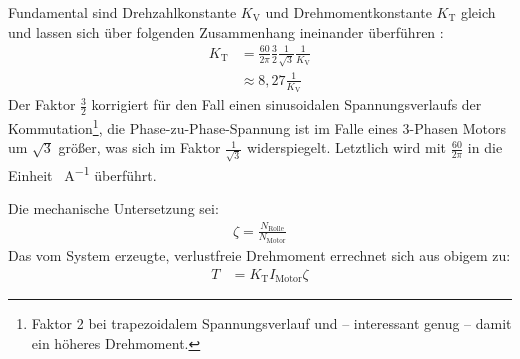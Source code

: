 		Fundamental sind Drehzahlkonstante \(K_\text{V}\) und Drehmomentkonstante \(K_\text{T}\) gleich und lassen sich über folgenden Zusammenhang ineinander überführen \cites{mevey2009sensorless}{DalY.Ohm.2000}{AN885.BLDC.fundamentals}:
		\begin{align}
			K_\text{T}	&= \frac{60}{2\pi} \frac{3}{2} \frac{1}{\sqrt{3}} \frac{1}{K_\text{V}} \nonumber \\
				&\approx 8,27 \frac{1}{K_\text{V}}
			\label{eq:kv to kt}
		\end{align}
		Der Faktor \(\frac{3}{2}\) korrigiert für den Fall einen sinusoidalen Spannungsverlaufs der Kommutation\footnote{\hspace{5mm}Faktor 2 bei trapezoidalem Spannungsverlauf und -- interessant genug -- damit ein höheres Drehmoment.}, die Phase-zu-Phase-Spannung ist im Falle eines 3-Phasen Motors um \(\sqrt{3}\) größer, was sich im Faktor \(\frac{1}{\sqrt{3}}\) widerspiegelt.
		Letztlich wird mit \(\frac{60}{2\pi}\) in die Einheit \unit{\newtonmetre\per\ampere} überführt.\par\medskip
		Die mechanische Untersetzung sei:
		\begin{align}
			\zeta = \frac{N_\text{Rolle}}{N_\text{Motor}}
			\label{eq:reduction}
		\end{align}
		Das vom System erzeugte, verlustfreie Drehmoment errechnet sich aus obigem zu:
		\begin{align}
			T	&= K_\text{T} I_\text{Motor} \zeta
			\label{eq:frictionless torque}
		\end{align}
		
		\nocite{Meschede.2015}\nocite{Demtroder.2018}